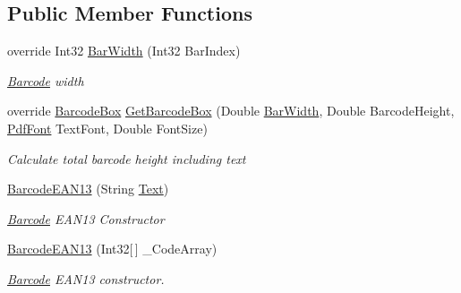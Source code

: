 \subsection*{Public Member Functions}
\begin{DoxyCompactItemize}
\item 
override Int32 \hyperlink{class_pdf_file_writer_1_1_barcode_e_a_n13_a892909c8d067b663d89306d6fc4705ec}{Bar\+Width} (Int32 Bar\+Index)
\begin{DoxyCompactList}\small\item\em \hyperlink{class_pdf_file_writer_1_1_barcode}{Barcode} width \end{DoxyCompactList}\item 
override \hyperlink{class_pdf_file_writer_1_1_barcode_box}{Barcode\+Box} \hyperlink{class_pdf_file_writer_1_1_barcode_e_a_n13_a765121df0b785c75a9c570bad7a2074e}{Get\+Barcode\+Box} (Double \hyperlink{class_pdf_file_writer_1_1_barcode_e_a_n13_a892909c8d067b663d89306d6fc4705ec}{Bar\+Width}, Double Barcode\+Height, \hyperlink{class_pdf_file_writer_1_1_pdf_font}{Pdf\+Font} Text\+Font, Double Font\+Size)
\begin{DoxyCompactList}\small\item\em Calculate total barcode height including text \end{DoxyCompactList}\item 
\hyperlink{class_pdf_file_writer_1_1_barcode_e_a_n13_a847392fe59c507599937a2dc3e1f26a9}{Barcode\+E\+A\+N13} (String \hyperlink{class_pdf_file_writer_1_1_barcode_a1fe2157662e4a1b52264823a382fde3f}{Text})
\begin{DoxyCompactList}\small\item\em \hyperlink{class_pdf_file_writer_1_1_barcode}{Barcode} E\+A\+N13 Constructor \end{DoxyCompactList}\item 
\hyperlink{class_pdf_file_writer_1_1_barcode_e_a_n13_a664a8c2a8089477291fb05c5453e626e}{Barcode\+E\+A\+N13} (Int32\mbox{[}$\,$\mbox{]} \+\_\+\+Code\+Array)
\begin{DoxyCompactList}\small\item\em \hyperlink{class_pdf_file_writer_1_1_barcode}{Barcode} E\+A\+N13 constructor. \end{DoxyCompactList}\end{DoxyCompactItemize}
